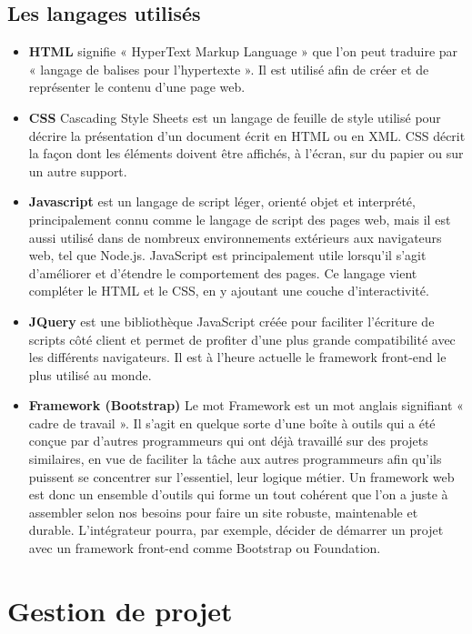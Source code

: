 \documentclass[a4paper, 12pt]{report}
\begin{document}
\subsection{Les langages utilisés}
\begin{itemize}
\item \textbf{HTML} signifie « HyperText Markup Language » que l'on peut traduire par « langage de balises pour l’hypertexte ». Il est utilisé afin de créer et de représenter le contenu d’une page web. 
\item \textbf{CSS} Cascading Style Sheets est un langage de feuille de style utilisé pour décrire la présentation d’un document écrit en HTML ou en XML. CSS décrit la façon dont les éléments doivent être affichés, à l’écran, sur du papier ou sur un autre support. 
\item \textbf{Javascript} est un langage de script léger, orienté objet et interprété, principalement connu comme le langage de script des pages web, mais il est aussi utilisé dans de nombreux environnements extérieurs aux navigateurs web, tel que Node.js. JavaScript est principalement utile lorsqu’il s’agit d’améliorer et d’étendre le comportement des pages. Ce langage vient compléter le HTML et le CSS, en y ajoutant une couche d’interactivité. 
\item \textbf{JQuery} est une bibliothèque JavaScript créée pour faciliter l’écriture de scripts côté client et permet de profiter d’une plus grande compatibilité avec les différents navigateurs. Il est à l’heure actuelle le framework front-end le plus utilisé au monde.
\item \textbf{Framework (Bootstrap)} Le mot Framework est un mot anglais signifiant « cadre de travail ». Il s’agit en quelque sorte d’une boîte à outils qui a été conçue par d’autres programmeurs qui ont déjà travaillé sur des projets similaires, en vue de faciliter la tâche aux autres programmeurs afin qu’ils puissent se concentrer sur l’essentiel, leur logique métier. Un framework web est donc un ensemble d’outils qui forme un tout cohérent que l’on a juste à assembler selon nos besoins pour faire un site robuste, maintenable et durable. L’intégrateur pourra, par exemple, décider de démarrer un projet avec un framework front-end comme Bootstrap ou Foundation. 
\end{itemize} 
\section{Gestion de projet}
\end{document}
